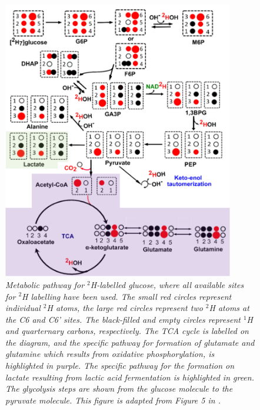 \begin{figure}
    \centering
    \includegraphics[width=0.9\textwidth]{Figures/Intro/D7_Metabolism.png}
    \caption{\textit{Metabolic pathway for $^2$H-labelled glucose, where all available sites for $^2$H labelling have been used. The small red circles represent individual $^2$H atoms, the large red circles represent two $^2$H atoms at the C6 and C6' sites. The black-filled and empty circles represent $^1$H and quarternary carbons, respectively. The \ac{TCA} cycle is labelled on the diagram, and the specific pathway for formation of glutamate and glutamine which results from oxidative phosphorylation, is highlighted in purple. The specific pathway for the formation on lactate resulting from lactic acid fermentation is highlighted in green. The glycolysis steps are shown from the glucose molecule to the pyruvate molecule. This figure is adapted from Figure 5 in \cite{Mahar2021DeuteratedGlucose}.}}
    \label{fig:intro:D7Metabolism}
\end{figure}

